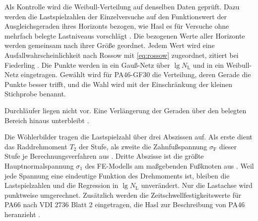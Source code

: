 
Als Kontrolle wird die Weibull-Verteilung auf denselben Daten geprüft. Dazu werden die Lastspielzahlen der Einzelversuche auf den Funktionswert der Ausgleichsgeraden ihres Horizonts bezogen, wie Hasl es für Versuche ohne mehrfach belegte Lastniveaus vorschlägt \cite[S.~109 bis 110]{Has18}. Die bezogenen Werte aller Horizonte werden gemeinsam nach ihrer Größe geordnet. Jedem Wert wird eine Ausfallwahrscheinlichkeit nach Rossow mit \eqref{eq:rossow} zugeordnet, zitiert bei Fiederling \cite[S.~34]{Fie23}. Die Punkte werden in ein Gauß-Netz über $\lg N_{\mathrm{L}}$ und in ein Weibull-Netz eingetragen. Gewählt wird für PA46-GF30 die Verteilung, deren Gerade die Punkte besser trifft, und die Wahl wird mit der Einschränkung der kleinen Stichprobe benannt.


Durchläufer liegen nicht vor. Eine Verlängerung der Geraden über den belegten Bereich hinaus unterbleibt \cite[S.~16]{DIN50100}.



Die Wöhlerbilder tragen die Lastspielzahl über drei Abszissen auf. Als erste dient das Raddrehmoment $T_{2}$ der Stufe, als zweite die Zahnfußspannung $\sigma_{\mathrm{F}}$ dieser Stufe je Berechnungsverfahren aus . Dritte Abszisse ist die größte Hauptnormalspannung $\sigma_{1}$ des FE-Modells am maßgebenden Fußknoten aus . Weil jede Spannung eine eindeutige Funktion des Drehmoments ist, bleiben die Lastspielzahlen und die Regression in $\lg N_{\mathrm{L}}$ unverändert. Nur die Lastachse wird punktweise umgerechnet. Zusätzlich werden die Zeitschwellfestigkeitswerte für PA66 nach VDI 2736 Blatt 2 eingetragen, die Hasl zur Beschreibung von PA46 heranzieht \cite[S.~118]{Has18}.

